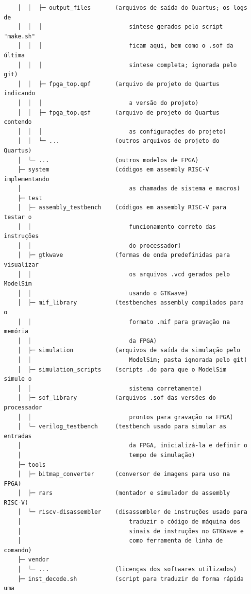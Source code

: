\begin{verbatim}
    │  │  ├─ output_files       (arquivos de saída do Quartus; os logs de
    │  │  │                         síntese gerados pelo script "make.sh"
    │  │  │                         ficam aqui, bem como o .sof da última
    │  │  │                         síntese completa; ignorada pelo git)
    │  │  ├─ fpga_top.qpf       (arquivo de projeto do Quartus indicando
    │  │  │                         a versão do projeto)
    │  │  ├─ fpga_top.qsf       (arquivo de projeto do Quartus contendo
    │  │  │                         as configurações do projeto)
    │  │  └─ ...                (outros arquivos de projeto do Quartus)
    │  └─ ...                   (outros modelos de FPGA)
    ├─ system                   (códigos em assembly RISC-V implementando
    │                               as chamadas de sistema e macros)
    ├─ test
    │  ├─ assembly_testbench    (códigos em assembly RISC-V para testar o
    │  │                            funcionamento correto das instruções
    │  │                            do processador)
    │  ├─ gtkwave               (formas de onda predefinidas para visualizar
    │  │                            os arquivos .vcd gerados pelo ModelSim
    │  │                            usando o GTKwave)
    │  ├─ mif_library           (testbenches assembly compilados para o
    │  │                            formato .mif para gravação na memória
    │  │                            da FPGA)
    │  ├─ simulation            (arquivos de saída da simulação pelo
    │  │                            ModelSim; pasta ignorada pelo git)
    │  ├─ simulation_scripts    (scripts .do para que o ModelSim simule o
    │  │                            sistema corretamente)
    │  ├─ sof_library           (arquivos .sof das versões do processador
    │  │                            prontos para gravação na FPGA)
    │  └─ verilog_testbench     (testbench usado para simular as entradas
    │                               da FPGA, inicializá-la e definir o
    │                               tempo de simulação)
    ├─ tools
    │  ├─ bitmap_converter      (conversor de imagens para uso na FPGA)
    │  ├─ rars                  (montador e simulador de assembly RISC-V)
    │  └─ riscv-disassembler    (disassembler de instruções usado para
    │                               traduzir o código de máquina dos
    │                               sinais de instruções no GTKWave e
    │                               como ferramenta de linha de comando)
    ├─ vendor
    │  └─ ...                   (licenças dos softwares utilizados)
    ├─ inst_decode.sh           (script para traduzir de forma rápida uma

\end{verbatim}
